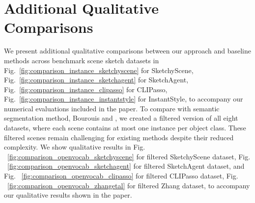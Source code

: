  
\section{Additional Qualitative Comparisons}
We present additional qualitative comparisons between our approach and baseline methods across  benchmark scene sketch datasets in Fig.~\ref{fig:comparison_instance_sketchyscene} for SketchyScene, Fig.~\ref{fig:comparison_instance_sketchagent} for SketchAgent, Fig.~\ref{fig:comparison_instance_clipasso} for CLIPasso, Fig.~\ref{fig:comparison_instance_instantstyle} for InstantStyle, to accompany our numerical evaluations included in the paper. 
To compare with semantic segmentation method, Bourouis \etal {} and , we created a filtered version of all eight datasets, where each scene contains at most one instance per object class. These filtered scenes remain challenging for existing methods despite their reduced complexity. We show qualitative results in Fig. ~\ref{fig:comparison_openvocab_sketchyscene} for filtered SketchyScene dataset, Fig. ~\ref{fig:comparison_openvocab_sketchagent} for filtered SketchAgent dataset, and Fig. ~\ref{fig:comparison_openvocab_clipasso} for filtered CLIPasso dataset, Fig. ~\ref{fig:comparison_openvocab_zhangetal} for filtered Zhang \etal dataset,  to accompany our qualitative results shown in the paper. 

\newpage

